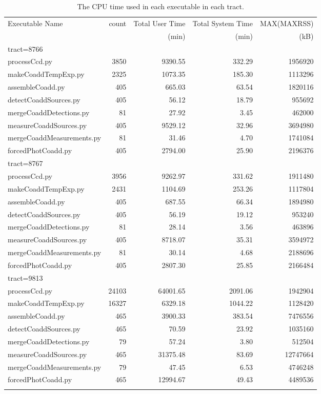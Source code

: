 \begin{longtable}{l|r|r|r|r} \label{tab:runtimeExec}
Executable Name & count & Total User Time & Total System Time & MAX(MAXRSS) \\
                &       & (min) & (min) & (kB) \\

\hline
tract=8766 \\
\hline
processCcd.py & 3850 & 9390.55 & 332.29 & 1956920 \\
makeCoaddTempExp.py & 2325&1073.35 & 185.30 & 1113296 \\
assembleCoadd.py & 405 & 665.03 & 63.54 & 1820116 \\
detectCoaddSources.py & 405 & 56.12 & 18.79 & 955692 \\
mergeCoaddDetections.py & 81 & 27.92 & 3.45 &   462000 \\
measureCoaddSources.py & 405 & 9529.12 & 32.96 & 3694980 \\
mergeCoaddMeasurements.py & 81 & 31.46 & 4.70 & 1741084 \\
forcedPhotCoadd.py & 405 & 2794.00 & 25.90 & 2196376 \\

\hline
tract=8767 \\
\hline
processCcd.py & 3956 & 9262.97 & 331.62 & 1911480 \\
makeCoaddTempExp.py & 2431 & 1104.69 & 253.26 & 1117804 \\
assembleCoadd.py & 405 & 687.55 & 66.34 & 1894980 \\
detectCoaddSources.py & 405 & 56.19 & 19.12 & 953240 \\
mergeCoaddDetections.py & 81 & 28.14 & 3.56 & 463896 \\
measureCoaddSources.py & 405 & 8718.07 & 35.31 & 3594972 \\
mergeCoaddMeasurements.py & 81 & 30.14 & 4.68 & 2188696 \\
forcedPhotCoadd.py & 405 & 2807.30 & 25.85 & 2166484 \\

\hline
tract=9813 \\
\hline
processCcd.py & 24103 & 64001.65 & 2091.06 &   1942904 \\
makeCoaddTempExp.py & 16327 & 6329.18 & 1044.22 &  1128420 \\
assembleCoadd.py & 465 & 3900.33 & 383.54 &   7476556 \\
detectCoaddSources.py & 465 & 70.59 & 23.92 & 1035160 \\
mergeCoaddDetections.py & 79 & 57.24 & 3.80 &   512504 \\
measureCoaddSources.py & 465 & 31375.48 & 83.69 & 12747664 \\
mergeCoaddMeasurements.py & 79 &  47.45 & 6.53 &   4746248 \\
forcedPhotCoadd.py & 465 & 12994.67 & 49.43 &   4489536 \\

\caption{The CPU time used in each executable in each tract.}
\end{longtable}
